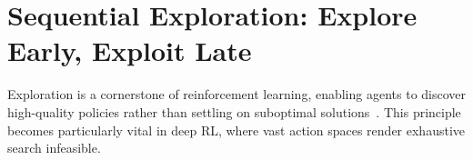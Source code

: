 \section{Sequential Exploration: Explore Early, Exploit Late}
\label{sec:exploitation-vs-exploration}
Exploration is a cornerstone of reinforcement learning, enabling agents to discover high-quality policies rather than settling on suboptimal solutions~\citep{sutton1998reinforcement, ladosz2022exploration}. 
%
This principle becomes particularly vital in deep RL, where vast action spaces render exhaustive search infeasible.
%
%
